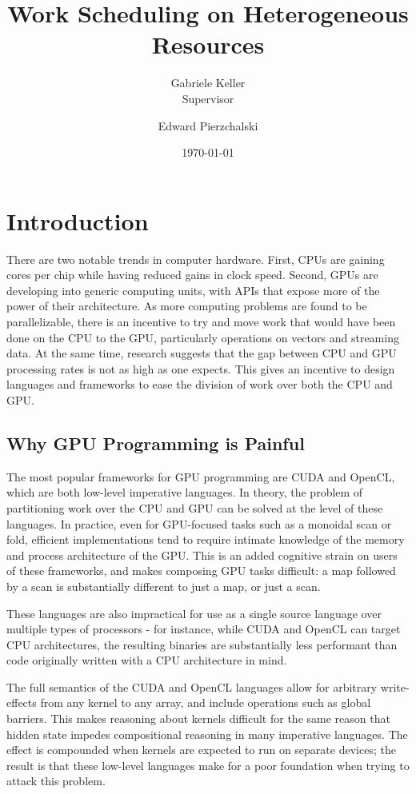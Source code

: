 \documentclass[a4paper,12pt]{article}
\title{Work Scheduling on Heterogeneous Resources}
\date{\today}
\author{Gabriele Keller\\\small{Supervisor} \and Edward Pierzchalski}
\begin{document}
\begin{titlepage}

\cleardoublepage
\maketitle
\thispagestyle{empty}

\end{titlepage}

\section{Introduction}
There are two notable trends in computer hardware. 
First, CPUs are gaining cores per chip while having reduced gains in clock speed. 
Second, GPUs are developing into generic computing units, with APIs that expose more of the power of their architecture.
As more computing problems are found to be parallelizable, there is an incentive to try and move work that would have been done on the CPU to the GPU, particularly operations on vectors and streaming data.
At the same time, research suggests that the gap between CPU and GPU processing rates is not as high as one expects. \citep{lee_debunking_2010, gregg_where_2011}
This gives an incentive to design languages and frameworks to ease the division of work over both the CPU and GPU.

\subsection{Why GPU Programming is Painful}
The most popular frameworks for GPU programming are CUDA and OpenCL, which are both low-level imperative languages. 
In theory, the problem of partitioning work over the CPU and GPU can be solved at the level of these languages. 
In practice, even for GPU-focused tasks such as a monoidal scan or fold, efficient implementations tend to require intimate knowledge of the memory and process architecture of the GPU. 
This is an added cognitive strain on users of these frameworks, and makes composing GPU tasks difficult: a map followed by a scan is substantially different to just a map, or just a scan.

These languages are also impractical for use as a single source language over multiple types of processors - for instance, while CUDA and OpenCL can target CPU architectures, the resulting binaries are substantially less performant than code originally written with a CPU architecture in mind.

The full semantics of the CUDA and OpenCL languages allow for arbitrary write-effects from any kernel to any array, and include operations such as global barriers. 
This makes reasoning about kernels difficult for the same reason that hidden state impedes compositional reasoning in many imperative languages. 
The effect is compounded when kernels are expected to run on separate devices; the result is that these low-level languages make for a poor foundation when trying to attack this problem.
\end{document}
